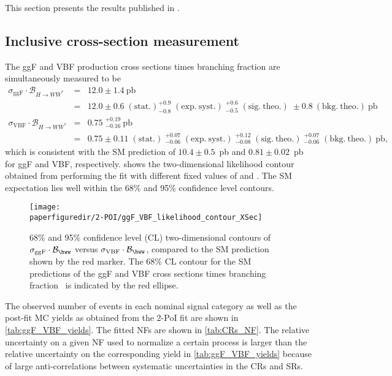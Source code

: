 This section presents the results published in .

\subsection{Inclusive cross-section measurement}
The ggF and VBF production cross sections times branching fraction are simultaneously measured to be
\begin{eqnarray*}
  \sigma_{\mathrm{ggF}} \cdot \mathcal{B}_{H \to WW^{\ast}} &=& 12.0 \pm 1.4~\mathrm{pb} \\
  &=& 12.0 \pm 0.6\;(\mathrm{stat.}) ^{+0.9}_{-0.8}\;(\mathrm{exp.~syst.})\;^{+0.6}_{-0.5}\;(\mathrm{sig.~theo.})\; \pm 0.8~(\mathrm{bkg.~theo.})~\mathrm{pb} \\
  \sigma_{\mathrm{VBF}} \cdot \mathcal{B}_{H \to WW^{\ast}} &=& 0.75\;^{+0.19}_{-0.16}~\mathrm{pb} \\
  &=& 0.75 \pm 0.11\;(\mathrm{stat.})\;^{+0.07}_{-0.06}\;(\mathrm{exp.~syst.})\;^{+0.12}_{-0.08}\;(\mathrm{sig.~theo.})\;^{+0.07}_{-0.06}\;(\mathrm{bkg.~theo.})~\mathrm{pb},
\end{eqnarray*}
which is consistent with the SM prediction of $10.4\pm 0.5$~pb and $0.81\pm 0.02$~pb for ggF and VBF\cite{deFlorian:2016spz}, respectively.
 shows the two-dimensional likelihood contour obtained from performing the fit with different fixed values of \muGGF and \muVBF. The SM expectation lies well within the 68\% and 95\% confidence level contours.
\begin{figure}[htb]
  \centering
  \texttt{[image: \\paperfiguredir/2-POI/ggF\_VBF\_likelihood\_contour\_XSec]}
  \caption{
    68\% and 95\% confidence level (CL) two-dimensional contours of $\sigma_{\mathrm{ggF}} \cdot \mathcal{B}_{\hww}$ versus \mbox{$\sigma_{\mathrm{VBF}}\cdot\mathcal{B}_{\hww}$}, compared to the SM prediction shown by the red marker.
    The 68\% CL contour for the SM predictions of the ggF and VBF cross sections times branching fraction~\cite{deFlorian:2016spz} is indicated by the red ellipse.
    \label{fig:LL2D}
  }
\end{figure}
The observed number of events in each nominal signal category as well as the post-fit MC yields as obtained from the 2-PoI fit are shown in \cref{tab:ggF_VBF_yields}.
The fitted NFs are shown in \cref{tab:CRs_NF}.
The relative uncertainty on a given NF used to normalize a certain process is larger than the relative uncertainty on the corresponding yield in \cref{tab:ggF_VBF_yields} because of large anti-correlations between systematic uncertainties in the CRs and SRs. 
